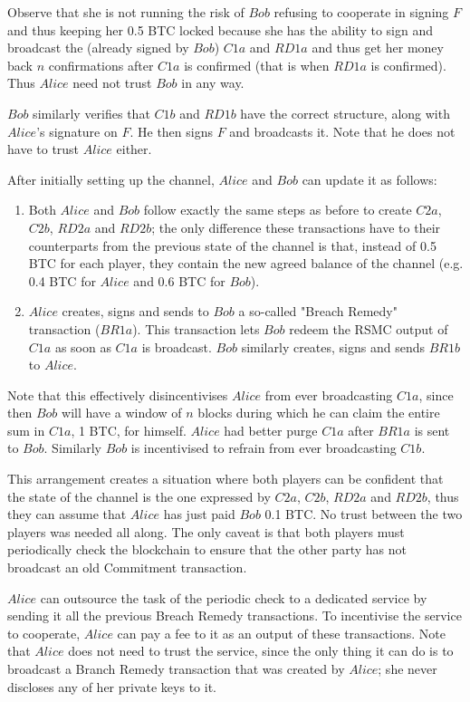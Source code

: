 \begin{enumerate}
    Observe that she is not running the risk of $Bob$ refusing to cooperate in signing $F$
    and thus keeping her 0.5 BTC locked because she has the ability to sign and broadcast
    the (already signed by $Bob$) $C1a$ and $RD1a$ and thus get her money back $n$
    confirmations after $C1a$ is confirmed (that is when $RD1a$ is confirmed). Thus
    $Alice$ need not trust $Bob$ in any way.

    $Bob$ similarly verifies that $C1b$ and $RD1b$ have the correct structure, along with
    $Alice$'s signature on $F$. He then signs $F$ and broadcasts it. Note that he does not
    have to trust $Alice$ either.
  \end{enumerate}

  After initially setting up the channel, $Alice$ and $Bob$ can update it as follows:
  \begin{enumerate}
    \item Both $Alice$ and $Bob$ follow exactly the same steps as before to create $C2a$,
    $C2b$, $RD2a$ and $RD2b$; the only difference these transactions have to their
    counterparts from the previous state of the channel is that, instead of 0.5 BTC for
    each player, they contain the new agreed balance of the channel (e.g. 0.4 BTC for
    $Alice$ and 0.6 BTC for $Bob$).

    \item $Alice$ creates, signs and sends to $Bob$ a so-called "Breach Remedy"
    transaction ($BR1a$). This transaction lets $Bob$ redeem the RSMC output of $C1a$ as
    soon as $C1a$ is broadcast. $Bob$ similarly creates, signs and sends $BR1b$ to
    $Alice$.
  \end{enumerate}
  Note that this effectively disincentivises $Alice$ from ever broadcasting $C1a$,
  since then $Bob$ will have a window of $n$ blocks during which he can claim the entire
  sum in $C1a$, 1 BTC, for himself. $Alice$ had better purge $C1a$ after $BR1a$ is sent to
  $Bob$. Similarly $Bob$ is incentivised to refrain from ever broadcasting $C1b$.

  This arrangement creates a situation where both players can be confident that the state
  of the channel is the one expressed by $C2a$, $C2b$, $RD2a$ and $RD2b$, thus they can
  assume that $Alice$ has just paid $Bob$ 0.1 BTC. No trust between the two players was
  needed all along. The only caveat is that both players must periodically check the
  blockchain to ensure that the other party has not broadcast an old Commitment
  transaction.

  $Alice$ can outsource the task of the periodic check to a dedicated service by sending
  it all the previous Breach Remedy transactions. To incentivise the service to cooperate,
  $Alice$ can pay a fee to it as an output of these transactions. Note that $Alice$ does
  not need to trust the service, since the only thing it can do is to broadcast a Branch
  Remedy transaction that was created by $Alice$; she never discloses any of her private
  keys to it.
